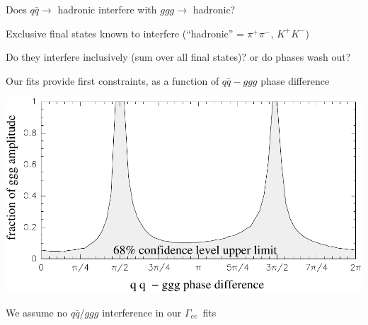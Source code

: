 \documentclass[landscape]{article}
\newcommand{\gee}{{\boldmath $\Gamma_{ee}$}}
\newcommand{\qqbar}{$q\bar{q}$}
\begin{document}
\begin{slide:interference}

Does $q\bar{q} \to$ hadronic interfere with $ggg \to$ hadronic?

\vfill
Exclusive final states known to interfere (``hadronic'' = $\pi^+\pi^-$, $K^+K^-$)

\vfill
Do they interfere inclusively (sum over all final states)? or do phases wash out?

\vfill
Our fits provide first constraints, as a function of $q\bar{q} - ggg$ phase difference

\vfill
\begin{center}
\includegraphics[width=0.65\linewidth]{plots/intconstraint}
\end{center}

\vfill
We assume no \qqbar/$ggg$ interference in our \gee\ fits

\end{slide:interference}
\end{document}
